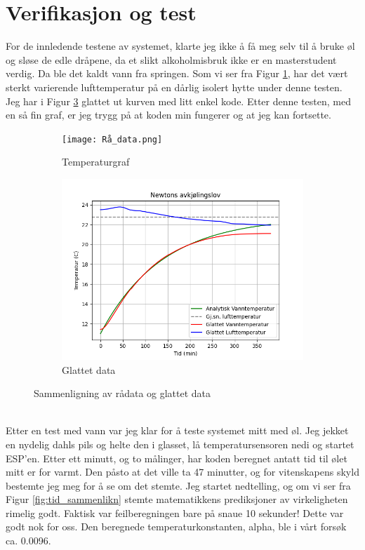 \documentclass{article}
\begin{document}
\section{Verifikasjon og test}
\label{Verifikasjon og test}
For de innledende testene av systemet, klarte jeg ikke å få meg selv til å bruke øl og sløse de edle dråpene, da et slikt alkoholmisbruk ikke er en masterstudent verdig. Da ble det kaldt vann fra springen.
Som vi ser fra Figur \ref{fig:temperaturgraf}, har det vært sterkt varierende lufttemperatur på en dårlig isolert hytte under denne testen. Jeg har i Figur \ref{fig:glattet} glattet ut kurven med litt enkel kode. Etter denne testen, med en så fin graf, er jeg trygg på at koden min fungerer og at jeg kan fortsette.
\begin{figure}[h!]
    \centering
    \begin{subfigure}[b]{0.45\textwidth}
        \centering
        \texttt{[image: Rå\_data.png]}
        \caption{Temperaturgraf}
        \label{fig:temperaturgraf}
    \end{subfigure}
    \hfill
    \begin{subfigure}[b]{0.45\textwidth}
        \centering
        \includegraphics[width=\textwidth]{Glattet_data.png}
        \caption{Glattet data}
        \label{fig:glattet}
    \end{subfigure}
    \caption{Sammenligning av rådata og glattet data}
\end{figure}\\
Etter en test med vann var jeg klar for å teste systemet mitt med øl. Jeg jekket en nydelig dahls pils og helte den i glasset, lå temperatursensoren nedi og startet ESP'en. Etter ett minutt, og to målinger, har koden beregnet antatt tid til ølet mitt er for varmt. Den påsto at det ville ta 47 minutter, og for vitenskapens skyld bestemte jeg meg for å se om det stemte. Jeg startet nedtelling, og om vi ser fra Figur \ref{fig:tid_sammenlikn} stemte matematikkens prediksjoner av virkeligheten rimelig godt. Faktisk var feilberegningen bare på snaue 10 sekunder! Dette var godt nok for oss. Den beregnede temperaturkonstanten, alpha, ble i vårt forsøk ca. 0.0096.
\end{document}

